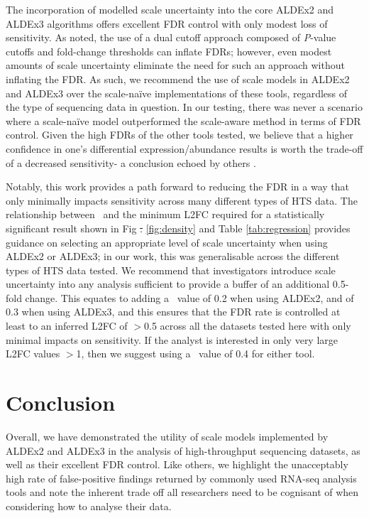 \documentclass[10pt,letterpaper]{article}
\providecommand{\DIFdeltex}[1]{{\protect\color{red}\sout{#1}}}                      %
\providecommand{\DIFdelbegin}{} %
\providecommand{\DIFdelend}{} %
\providecommand{\DIFdel}[1]{\texorpdfstring{\DIFdeltex{#1}}{}} %
\newcommand{\DIFscaledelfig}{0.5}
\newlength{\DIFdelgraphicswidth} %
\newlength{\DIFdelgraphicsheight} %
\newcommand{\DIFdelincludegraphics}[2][]{%
\sbox{\DIFdelgraphicsbox}{\DIFOincludegraphics[#1]{#2}}%
\settoboxwidth{\DIFdelgraphicswidth}{\DIFdelgraphicsbox} %
\settoboxtotalheight{\DIFdelgraphicsheight}{\DIFdelgraphicsbox} %
\scalebox{\DIFscaledelfig}{%
\parbox[b]{\DIFdelgraphicswidth}{\usebox{\DIFdelgraphicsbox}\\[-\baselineskip] \rule{\DIFdelgraphicswidth}{0em}}\llap{\resizebox{\DIFdelgraphicswidth}{\DIFdelgraphicsheight}{%
\setlength{\unitlength}{\DIFdelgraphicswidth}%
\begin{picture}(1,1)%
\thicklines\linethickness{2pt} %
{\color[rgb]{1,0,0}\put(0,0){\framebox(1,1){}}}%
{\color[rgb]{1,0,0}\put(0,0){\line( 1,1){1}}}%
{\color[rgb]{1,0,0}\put(0,1){\line(1,-1){1}}}%
\end{picture}%
}\hspace*{3pt}}} %
} %
\DeclareRobustCommand{\DIFdelbegin}{\DIFOdelbegin \let\includegraphics\DIFdelincludegraphics} %
\DeclareRobustCommand{\DIFdelend}{\DIFOaddend \let\includegraphics\DIFOincludegraphics} %
\begin{document}
The incorporation of modelled scale uncertainty into the core ALDEx2 and ALDEx3 algorithms offers excellent FDR control with only modest loss of sensitivity. As noted, the use of a dual cutoff approach composed of \textit{P}-value cutoffs and fold-change thresholds can inflate FDRs; however, even modest amounts of scale uncertainty eliminate the need for such an approach without inflating the FDR. As such, we recommend the use of scale models in ALDEx2 and ALDEx3 over the scale-na\"ive implementations of these tools, regardless of the type of sequencing data in question. In our testing, there was never a scenario where a scale-na\"ive model outperformed the scale-aware method in terms of FDR control. Given the high FDRs of the other tools tested, we believe that a higher confidence in one's differential expression/abundance results is worth the trade-off of a decreased sensitivity- a conclusion echoed by others \cite{Nearing:2022aa, weiss_normalization_2017}. 

Notably, this work provides a path forward to reducing the FDR in a way that only minimally impacts sensitivity across many different types of HTS data. The relationship between \textgamma~and the minimum L2FC required for a statistically significant result shown in Fig \DIFdelbegin \DIFdel{. }\DIFdelend \ref{fig:density} and Table \ref{tab:regression} provides guidance on selecting an appropriate level of scale uncertainty when using ALDEx2 or ALDEx3; in our work, this was generalisable across the different types of HTS data tested. We recommend that investigators introduce scale uncertainty into any analysis sufficient to provide a buffer of an additional 0.5-fold change. This equates to adding a \textgamma~value of 0.2 when using ALDEx2, and of 0.3 when using ALDEx3, and this ensures that the FDR rate is controlled at least to an inferred L2FC of $>$0.5 across all the datasets tested here with only minimal impacts on sensitivity. If the analyst is interested in only very large L2FC values $>$1, then we suggest using a \textgamma~value of 0.4 for either tool.

\section*{Conclusion}
Overall, we have demonstrated the utility of scale models implemented by ALDEx2 and ALDEx3 in the analysis of high-throughput sequencing datasets, as well as their excellent FDR control. Like others, we highlight the unacceptably high rate of false-positive findings returned by commonly used RNA-seq analysis tools and note the inherent trade off all researchers need to be cognisant of when considering how to analyse their data.
\end{document}
